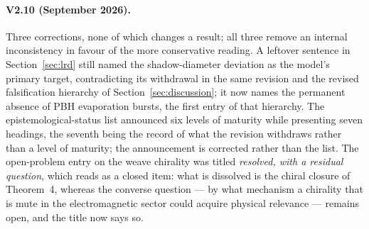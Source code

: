 \documentclass[11pt,a4paper]{article}
\theoremstyle{plain}
\theoremstyle{remark}
\begin{document}
\paragraph{V2.10 (September 2026).} Three corrections, none of which changes a result; all three remove an internal inconsistency in favour of the more conservative reading. A leftover sentence in Section~\ref{sec:lrd} still named the shadow-diameter deviation as the model's primary target, contradicting its withdrawal in the same revision and the revised falsification hierarchy of Section~\ref{sec:discussion}; it now names the permanent absence of PBH evaporation bursts, the first entry of that hierarchy. The epistemological-status list announced six levels of maturity while presenting seven headings, the seventh being the record of what the revision withdraws rather than a level of maturity; the announcement is corrected rather than the list. The open-problem entry on the weave chirality was titled \emph{resolved, with a residual question}, which reads as a closed item: what is dissolved is the chiral closure of Theorem~4, whereas the converse question --- by what mechanism a chirality that is mute in the electromagnetic sector could acquire physical relevance --- remains open, and the title now says so.
\end{document}
